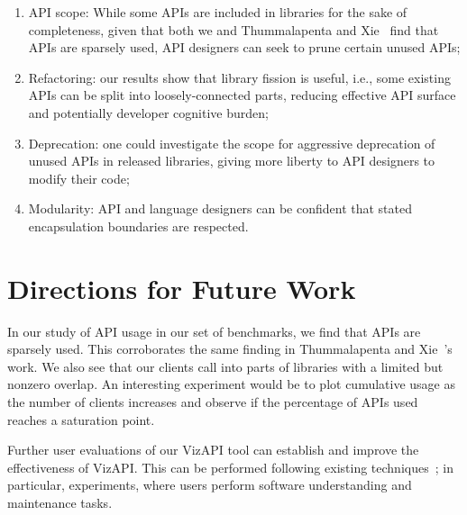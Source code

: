 \begin{enumerate}
\item API scope: While some APIs are included in libraries for the sake of completeness, given that both we and Thummalapenta and Xie~\cite{thummalapenta08:_spotw} find
that APIs are sparsely used, API designers can seek to prune certain unused APIs;
\item Refactoring: our results show that library fission is useful, i.e., some existing APIs can be split into loosely-connected parts, reducing effective API surface and potentially developer cognitive burden;
\item Deprecation: one could investigate the scope for aggressive deprecation of unused APIs in released libraries, giving more liberty to API designers to modify their code;
\item Modularity: API and language designers can be confident that stated encapsulation boundaries are respected.
\end{enumerate}


\section{Directions for Future Work}
In our study of API usage in our set of benchmarks, we find that APIs are sparsely used. 
This corroborates the same finding in Thummalapenta and Xie~\cite{thummalapenta08:_spotw}'s work.
We also see that our clients call into parts of libraries with a limited but nonzero overlap. 
An interesting experiment would be to plot cumulative usage as the number of clients increases and observe if the percentage of APIs used reaches a saturation
point.

Further user evaluations of our VizAPI tool can establish and improve the
effectiveness of VizAPI. This can be performed following
existing techniques~\cite{merino18:_system_liter_review_softw_visual_evaluat}; in
particular, experiments, where users perform software
understanding and maintenance tasks.
